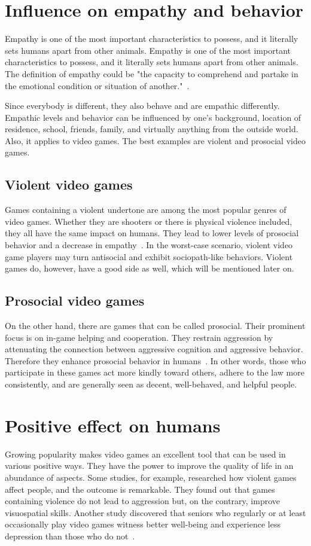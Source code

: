 \documentclass[10pt,twoside,english,a4paper]{article}
\begin{document}
\section{Influence on empathy and behavior}
Empathy is one of the most important characteristics to possess, and it literally sets humans apart from other animals. Empathy is one of the most important characteristics to possess, and it literally sets humans apart from other animals. The definition of empathy could be "the capacity to comprehend and partake in the emotional condition or situation of another."~\cite{empathy}.

Since everybody is different, they also behave and are empathic differently. Empathic levels and behavior can be influenced by one's background, location of residence, school, friends, family, and virtually anything from the outside world. Also, it applies to video games. The best examples are violent and prosocial video games.

\subsection{Violent video games}
Games containing a violent undertone are among the most popular genres of video games. Whether they are shooters or there is physical violence included, they all have the same impact on humans. They lead to lower levels of prosocial behavior and a decrease in empathy~\cite{empathy}. In the worst-case scenario, violent video game players may turn antisocial and exhibit sociopath-like behaviors. Violent games do, however, have a good side as well, which will be mentioned later on.

\subsection{Prosocial video games}
On the other hand, there are games that can be called prosocial. Their prominent focus is on in-game helping and cooperation. They restrain aggression by attenuating the connection between aggressive cognition and aggressive behavior. Therefore they enhance prosocial behavior in humans~\cite{empathy}. In other words, those who participate in these games act more kindly toward others, adhere to the law more consistently, and are generally seen as decent, well-behaved, and helpful people.

\section{Positive effect on humans}
Growing popularity makes video games an excellent tool that can be used in various positive ways. They have the power to improve the quality of life in an abundance of aspects. Some studies, for example, researched how violent games affect people, and the outcome is remarkable. They found out that games containing violence do not lead to aggression but, on the contrary, improve visuospatial skills. Another study discovered that seniors who regularly or at least occasionally play video games witness better well-being and experience less depression than those who do not~\cite{poz-neg-sol}.
\end{document}
